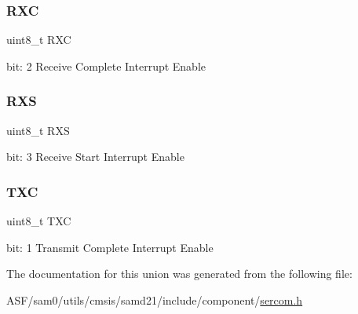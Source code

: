 \subsubsection{\texorpdfstring{RXC}{RXC}}
{\footnotesize\ttfamily uint8\+\_\+t R\+XC}

bit\+: 2 Receive Complete Interrupt Enable \mbox{\label{union_s_e_r_c_o_m___u_s_a_r_t___i_n_t_e_n_s_e_t___type_ab54b6e9387289f3bbffba2ad5b5fd646}} 
\subsubsection{\texorpdfstring{RXS}{RXS}}
{\footnotesize\ttfamily uint8\+\_\+t R\+XS}

bit\+: 3 Receive Start Interrupt Enable \mbox{\label{union_s_e_r_c_o_m___u_s_a_r_t___i_n_t_e_n_s_e_t___type_a8f012b40a2f5cf52b14d448b314b5cec}} 
\subsubsection{\texorpdfstring{TXC}{TXC}}
{\footnotesize\ttfamily uint8\+\_\+t T\+XC}

bit\+: 1 Transmit Complete Interrupt Enable 

The documentation for this union was generated from the following file\+:\begin{DoxyCompactItemize}
\item 
A\+S\+F/sam0/utils/cmsis/samd21/include/component/\mbox{\hyperlink{utils_2cmsis_2samd21_2include_2component_2sercom_8h}{sercom.\+h}}\end{DoxyCompactItemize}
